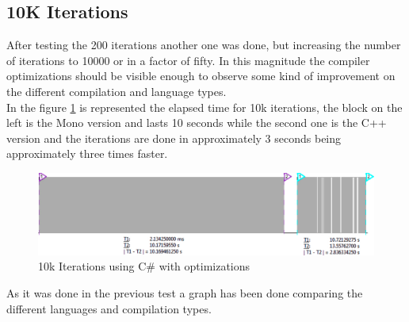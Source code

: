 \subsection{10K Iterations}\label{SS:10K-iterations}
After testing the 200 iterations another one was done, but increasing the number of iterations to 10000 or in a factor of fifty. In this magnitude the compiler optimizations should be visible enough to observe some kind of improvement on the different compilation and language types.
\\
In the figure \ref{fig:gpio-10kit-csharp+cpp} is represented the elapsed time for 10k iterations, the block on the left is the Mono version and lasts 10 seconds while the second one is the C++ version and the iterations are done in approximately 3 seconds being approximately three times faster.
\begin{figure}[H]\begin{center}
 \centering
  \captionsetup{justification=centering}
  \includegraphics[width=1\textwidth]{pictures/performance-tests/GPIO/10k/cxx+csharp}
  \caption{10k Iterations using C\# with optimizations \label{fig:gpio-10kit-csharp+cpp}}
\end{center}\end{figure}
As it was done in the previous test a graph has been done comparing the different languages and compilation types.
